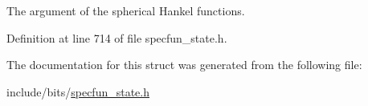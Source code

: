 The argument of the spherical Hankel functions. 



Definition at line 714 of file specfun\+\_\+state.\+h.



The documentation for this struct was generated from the following file\+:\begin{DoxyCompactItemize}
\item 
include/bits/\hyperlink{specfun__state_8h}{specfun\+\_\+state.\+h}\end{DoxyCompactItemize}
